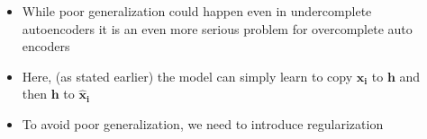 
\begin{frame}
    \begin{columns}
        \begin{overlayarea}{\textwidth}{\textheight}
            \vspace{5pt}
        
        \end{overlayarea}
    
        \begin{overlayarea}{\textwidth}{\textheight}
            \begin{itemize}\justifying
                \item<2-> While poor generalization could happen even in undercomplete autoencoders it is an even more serious problem for overcomplete auto encoders
                \item<3-> Here, (as stated earlier) the model can simply learn to copy $\mathbf{x_i}$ to $\mathbf{h}$ and then $\mathbf{h}$ to $\mathbf{\hat{x}_i}$
                \item<4-> To avoid poor generalization, we need to introduce regularization
            \end{itemize}
        \end{overlayarea}
    \end{columns}
\end{frame}

